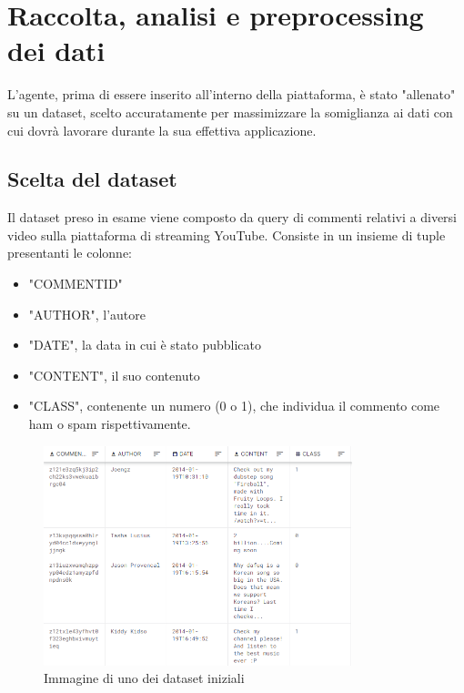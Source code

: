 \documentclass{report}
\begin{document}
    

                        


   
    \chapter{Raccolta, analisi e preprocessing dei dati}
    L'agente, prima di essere inserito all'interno della piattaforma, è stato "allenato" su un dataset, scelto accuratamente per massimizzare la somiglianza ai dati con cui dovrà lavorare 
    durante la sua effettiva applicazione. 
    \section{Scelta del dataset}
    Il dataset preso in esame viene composto da query di commenti relativi a diversi video sulla piattaforma di streaming YouTube. 
    Consiste in un insieme di tuple presentanti le colonne:
    \begin{itemize}

        \item "COMMENT\textunderscore ID"

        \item "AUTHOR", l'autore
        \item "DATE", la data in cui è stato pubblicato
        \item "CONTENT", il suo contenuto
        \item "CLASS", contenente un numero (0 o 1), che individua il commento come ham o spam rispettivamente.
    \end{itemize}

    
    \begin{figure}[h]

        \centering
        \includegraphics[width = 0.8\textwidth]{immagini/datasetExample.png}
        \caption{Immagine di uno dei dataset iniziali}

    \end{figure}
\end{document}
